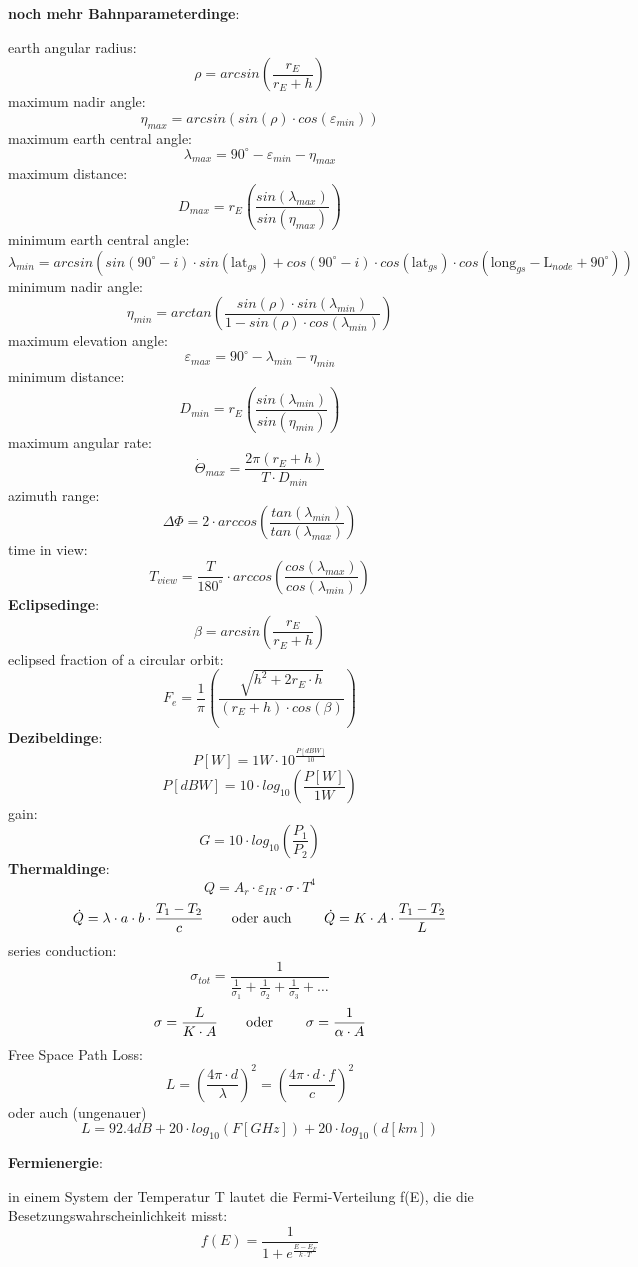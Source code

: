\documentclass[a4paper,10pt]{article}
\newcommand{\f}{\textbf}
\begin{document}
\noindent \f{noch mehr Bahnparameterdinge}:
\vspace*{5pt}

\noindent earth angular radius:
\[\rho = arcsin\left(\frac{r_E}{r_E + h}\right)\]
maximum nadir angle:
\[\eta_{max} = arcsin(sin(\rho)\cdot cos(\varepsilon_{min})) \]
maximum earth central angle:
\[\lambda_{max} = 90^{\circ} - \varepsilon_{min} - \eta_{max}\]
maximum distance:
\[D_{max} = r_E\left(\frac{sin(\lambda_{max})}{sin(\eta_{max})} \right)\]
minimum earth central angle:
\[\lambda_{min} = arcsin(sin(90^{\circ}-i)\cdot sin(\text{lat}_{gs}) + cos(90^{\circ}-i)\cdot cos(\text{lat}_{gs})\cdot cos(\text{long}_{gs}-\text{L}_{node}+90^{\circ}))\]
minimum nadir angle:
\[\eta_{min} = arctan\left(\frac{sin(\rho)\cdot sin(\lambda_{min})}{1-sin(\rho)\cdot cos(\lambda_{min})}\right)\]
maximum elevation angle:
\[\varepsilon_{max} = 90^{\circ} -\lambda_{min} - \eta_{min}\]
minimum distance:
\[D_{min} = r_E\left(\frac{sin(\lambda_{min})}{sin(\eta_{min})}\right)\]
maximum angular rate:
\[\dot{\Theta}_{max} = \frac{2\pi(r_E + h)}{T\cdot D_{min}}\]
azimuth range:
\[\Delta \Phi = 2\cdot arccos\left(\frac{tan(\lambda_{min})}{tan(\lambda_{max})}\right)\]
time in view:
\[T_{view} = \frac{T}{180^{\circ}}\cdot arccos\left(\frac{cos(\lambda_{max})}{cos(\lambda_{min})}\right)\]
\f{Eclipsedinge}:
\[\beta = arcsin\left(\frac{r_E}{r_E+h}\right)\]
eclipsed fraction of a circular orbit:
\[F_e = \frac{1}{\pi}\left(\frac{\sqrt{h^2 +2r_E\cdot h}}{(r_E + h)\cdot cos(\beta)} \right)\]
\f{Dezibeldinge}:
\[P[W] = 1W\cdot 10^{\frac{P[dBW]}{10}}\]
\[P[dBW] = 10\cdot log_{10}\left(\frac{P[W]}{1W}\right)\]
gain:
\[G = 10\cdot log_{10}\left(\frac{P_1}{P_2}\right)\]
\f{Thermaldinge}:
\[Q = A_r\cdot \varepsilon_{IR}\cdot \sigma \cdot T^4\]
\[\dot{Q} = \lambda\cdot a\cdot b \cdot \frac{T_1-T_2}{c} \text{\qquad oder auch \qquad} \dot{Q} = K \cdot A \cdot \frac{T_1-T_2}{L}\]
series conduction:
\[\sigma_{tot} = \frac{1}{\frac{1}{\sigma_1} + \frac{1}{\sigma_2} + \frac{1}{\sigma_3} + \dots}\]
\[\sigma = \frac{L}{K\cdot A} \text{\qquad oder \qquad} \sigma = \frac{1}{\alpha\cdot A}\]
Free Space Path Loss:
\[L = \left(\frac{4\pi\cdot d}{\lambda}\right)^2 = \left(\frac{4\pi\cdot d\cdot f}{c}\right)^2\] 
oder auch (ungenauer)
\[L = 92.4dB + 20\cdot log_{10}(F[GHz]) + 20\cdot log_{10}(d[km])\]
\vspace*{5pt}

\noindent
\f{Fermienergie}:\\
\vspace*{3pt}

\noindent in einem System der Temperatur T lautet die Fermi-Verteilung f(E), die die Besetzungswahrscheinlichkeit misst:
\[f(E) = \frac{1}{1 + e^{\frac{E-E_F}{k\cdot T}}}\]
\vspace*{5pt}
\end{document}
